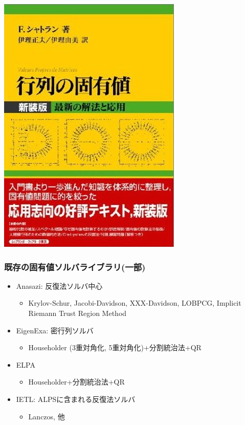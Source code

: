 \begin{frame}
\begin{center}
    \includegraphics[height=0.6\textheight]{figure/book.jpg}
  \end{center}
\end{frame}

\begin{frame}
  \frametitle{既存の固有値ソルバライブラリ(一部)}
  \begin{itemize}
  \item Anasazi: 反復法ソルバ中心
    \begin{itemize}
      \item Krylov-Schur, Jacobi-Davidson, XXX-Davidson, LOBPCG, Implicit Riemann Trust Region Method
    \end{itemize}
  \item EigenExa: 密行列ソルバ
    \begin{itemize}
      \item Householder (3重対角化, 5重対角化)+分割統治法+QR
    \end{itemize}
  \item ELPA
    \begin{itemize}
      \item Householder+分割統治法+QR
    \end{itemize}
  \item IETL: ALPSに含まれる反復法ソルバ
    \begin{itemize}
      \item Lanczos, 他
    \end{itemize}
  \end{itemize}
\end{frame}

